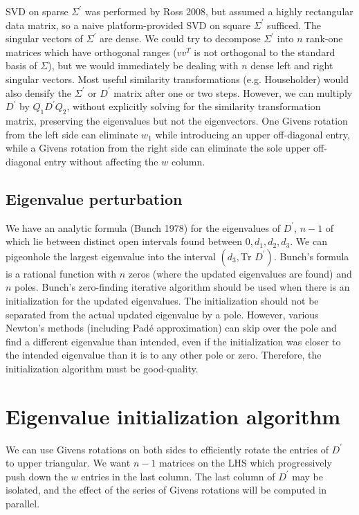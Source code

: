 \documentclass{article}
\begin{document}
SVD on sparse $\Sigma^\prime$ was performed by Ross 2008, but assumed a highly rectangular data matrix, so a naive platform-provided SVD on square $\Sigma^\prime$ sufficed. The singular vectors of $\Sigma^\prime$ are dense. We could try to decompose $\Sigma^\prime$ into $n$ rank-one matrices which have orthogonal ranges ($v v^T$ is not orthogonal to the standard basis of $\Sigma$), but we would immediately be dealing with $n$ dense left and right singular vectors. Most useful similarity transformations (e.g. Householder) would also densify the $\Sigma^\prime$ or $D^\prime$ matrix after one or two steps. However, we can multiply $D^\prime$ by $Q_1 D^\prime Q_2$, without explicitly solving for the similarity transformation matrix, preserving the eigenvalues but not the eigenvectors. One Givens rotation from the left side can eliminate $w_1$ while introducing an upper off-diagonal entry, while a Givens rotation from the right side can eliminate the sole upper off-diagonal entry without affecting the $w$ column.

\subsection*{Eigenvalue perturbation}

We have an analytic formula (Bunch 1978) for the eigenvalues of $D^\prime$, $n-1$ of which lie between distinct open intervals found between $0,d_1,d_2,d_3$. We can pigeonhole the largest eigenvalue into the interval $(d_3, \text{Tr } D^\prime)$. Bunch's formula is a rational function with $n$ zeros (where the updated eigenvalues are found) and $n$ poles. Bunch's zero-finding iterative algorithm should be used when there is an initialization for the updated eigenvalues. The initialization should not be separated from the actual updated eigenvalue by a pole. However, various Newton's methods (including Pad\'{e} approximation) can skip over the pole and find a different eigenvalue than intended, even if the initialization was closer to the intended eigenvalue than it is to any other pole or zero. Therefore, the initialization algorithm must be good-quality.

\section{Eigenvalue initialization algorithm}

We can use Givens rotations on both sides to efficiently rotate the entries of $D^\prime$ to upper triangular. We want $n-1$ matrices on the LHS which progressively push down the $w$ entries in the last column. The last column of $D^\prime$ may be isolated, and the effect of the series of Givens rotations will be computed in parallel.
\end{document}
